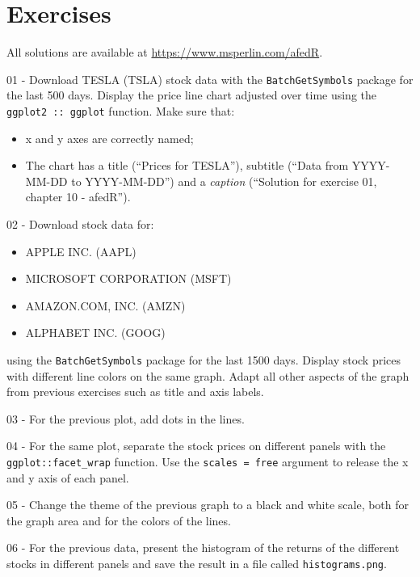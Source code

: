 \documentclass[
  12pt,
]{book}
\providecommand{\tightlist}{%
  \setlength{\itemsep}{0pt}\setlength{\parskip}{0pt}}
\begin{document}
\hypertarget{exercises-10}{%
\section{Exercises}\label{exercises-10}}

All solutions are available at \url{https://www.msperlin.com/afedR}.

01 -
Download TESLA (TSLA) stock data with the \texttt{BatchGetSymbols} package for the last 500 days. Display the price line chart adjusted over time using the \texttt{ggplot2\ ::\ ggplot} function. Make sure that:

\begin{itemize}
\tightlist
\item
  x and y axes are correctly named;
\item
  The chart has a title (``Prices for TESLA''), subtitle (``Data from YYYY-MM-DD to YYYY-MM-DD'') and a \emph{caption} (``Solution for exercise 01, chapter 10 - afedR'').
\end{itemize}

02 -
Download stock data for:

\begin{itemize}
\tightlist
\item
  APPLE INC. (AAPL)
\item
  MICROSOFT CORPORATION (MSFT)
\item
  AMAZON.COM, INC. (AMZN)
\item
  ALPHABET INC. (GOOG)
\end{itemize}

using the \texttt{BatchGetSymbols} package for the last 1500 days. Display stock prices with different line colors on the same graph. Adapt all other aspects of the graph from previous exercises such as title and axis labels.

03 -
For the previous plot, add dots in the lines.

04 -
For the same plot, separate the stock prices on different panels with the \texttt{ggplot::facet\_wrap} function. Use the \texttt{scales\ =\ \textquotesingle{}free\textquotesingle{}} argument to release the x and y axis of each panel.

05 -
Change the theme of the previous graph to a black and white scale, both for the graph area and for the colors of the lines.

06 -
For the previous data, present the histogram of the returns of the different stocks in different panels and save the result in a file called \texttt{\textquotesingle{}histograms.png\textquotesingle{}}.
\end{document}
